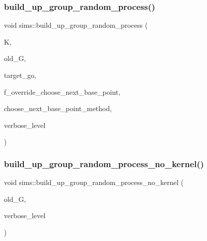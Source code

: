 \subsubsection{\texorpdfstring{build\+\_\+up\+\_\+group\+\_\+random\+\_\+process()}{build\_up\_group\_random\_process()}}
{\footnotesize\ttfamily void sims\+::build\+\_\+up\+\_\+group\+\_\+random\+\_\+process (\begin{DoxyParamCaption}\item[{\mbox{\hyperlink{classsims}{sims}} $\ast$}]{K,  }\item[{\mbox{\hyperlink{classsims}{sims}} $\ast$}]{old\+\_\+G,  }\item[{\mbox{\hyperlink{classlonginteger__object}{longinteger\+\_\+object}} \&}]{target\+\_\+go,  }\item[{\mbox{\hyperlink{galois_8h_a09fddde158a3a20bd2dcadb609de11dc}{I\+NT}}}]{f\+\_\+override\+\_\+choose\+\_\+next\+\_\+base\+\_\+point,  }\item[{\mbox{\hyperlink{galois_8h_a09fddde158a3a20bd2dcadb609de11dc}{I\+NT}}($\ast$)(\mbox{\hyperlink{classaction}{action}} $\ast$\mbox{\hyperlink{classsims_a3311c97dc08837220191985b1c7ee73f}{A}}, \mbox{\hyperlink{galois_8h_a09fddde158a3a20bd2dcadb609de11dc}{I\+NT}} $\ast$\mbox{\hyperlink{simeon_8_c_aec1406935bdb1fee3561fcb840964100}{Elt}}, \mbox{\hyperlink{galois_8h_a09fddde158a3a20bd2dcadb609de11dc}{I\+NT}} \mbox{\hyperlink{simeon_8_c_a818073fbcc2f439e7c56952f67386122}{verbose\+\_\+level}})}]{choose\+\_\+next\+\_\+base\+\_\+point\+\_\+method,  }\item[{\mbox{\hyperlink{galois_8h_a09fddde158a3a20bd2dcadb609de11dc}{I\+NT}}}]{verbose\+\_\+level }\end{DoxyParamCaption})}

\mbox{\label{classsims_a33747471a3e1ebdee59aff4edde62669}} 
\subsubsection{\texorpdfstring{build\+\_\+up\+\_\+group\+\_\+random\+\_\+process\+\_\+no\+\_\+kernel()}{build\_up\_group\_random\_process\_no\_kernel()}}
{\footnotesize\ttfamily void sims\+::build\+\_\+up\+\_\+group\+\_\+random\+\_\+process\+\_\+no\+\_\+kernel (\begin{DoxyParamCaption}\item[{\mbox{\hyperlink{classsims}{sims}} $\ast$}]{old\+\_\+G,  }\item[{\mbox{\hyperlink{galois_8h_a09fddde158a3a20bd2dcadb609de11dc}{I\+NT}}}]{verbose\+\_\+level }\end{DoxyParamCaption})}


